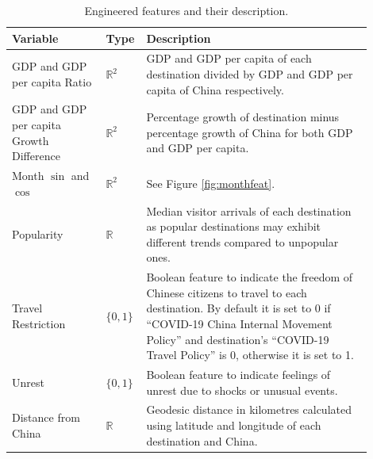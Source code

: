 \documentclass{article}
\begin{document}
\begin{table}[htbp]
\small
    \centering
        \begin{tabular}{p{0.25\linewidth} |p{0.05\linewidth} |p{0.6\linewidth}}
            Variable & Type & Description \\
            \hline
            \hline
            GDP and GDP per capita Ratio & $\mathbb{R}^2$ & GDP and GDP per capita of each destination divided by GDP and GDP per capita of China respectively. \\
            \hline
            GDP and GDP per capita Growth Difference & $\mathbb{R}^2$ & Percentage growth of destination minus percentage growth of China for both GDP and GDP per capita. \\
            \hline
            Month $\sin$ and $\cos$ & $\mathbb{R}^2$ & See Figure \ref{fig:monthfeat}. \\
            \hline
            Popularity & $\mathbb{R}$ & Median visitor arrivals of each destination as popular destinations may exhibit different trends compared to unpopular ones. \\
            \hline
            Travel Restriction & $\{0, 1\}$ & Boolean feature to indicate the freedom of Chinese citizens to travel to each destination. By default it is set to 0 if ``COVID-19 China Internal Movement Policy'' and destination's ``COVID-19 Travel Policy'' is 0, otherwise it is set to 1. \\
            \hline
            Unrest & $\{0, 1\}$ & Boolean feature to indicate feelings of unrest due to shocks or unusual events. \\
            \hline
            Distance from China & $\mathbb{R}$ & Geodesic distance in kilometres calculated using latitude and longitude of each destination and China. \\
            \hline
        \end{tabular}
    \caption{Engineered features and their description.}
    \label{table:feateng}
\end{table}
\end{document}
